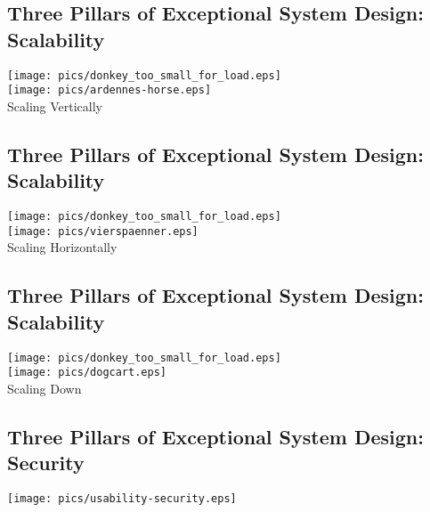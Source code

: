 \documentclass[xga]{xdvislides}
\begin{document}
\subsection{Three Pillars of Exceptional System Design: Scalability}
\vspace*{\fill}
\begin{center}
    \texttt{[image: pics/donkey\_too\_small\_for\_load.eps]} \\
    \texttt{[image: pics/ardennes-horse.eps]} \\
	Scaling Vertically
\end{center}
\vspace*{\fill}


\subsection{Three Pillars of Exceptional System Design: Scalability}
\vspace*{\fill}
\begin{center}
    \texttt{[image: pics/donkey\_too\_small\_for\_load.eps]} \\
    \texttt{[image: pics/vierspaenner.eps]} \\
	Scaling Horizontally
\end{center}
\vspace*{\fill}

\subsection{Three Pillars of Exceptional System Design: Scalability}
\vspace*{\fill}
\begin{center}
    \texttt{[image: pics/donkey\_too\_small\_for\_load.eps]} \\
    \texttt{[image: pics/dogcart.eps]} \\
	Scaling Down
\end{center}
\vspace*{\fill}

\subsection{Three Pillars of Exceptional System Design: Security}
\vspace*{\fill}
\begin{center}
    \texttt{[image: pics/usability-security.eps]} \\
\end{center}
\vspace*{\fill}
\end{document}
